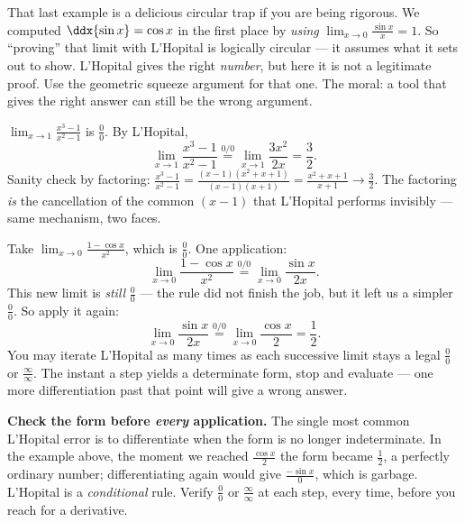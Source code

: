 \begin{trapbox}
That last example is a delicious circular trap if you are being rigorous. We computed
$\ddx{\sin x}=\cos x$ in the first place by \emph{using}
$\lim_{x\to0}\tfrac{\sin x}{x}=1$. So ``proving'' that limit with L'Hopital is
logically circular --- it assumes what it sets out to show. L'Hopital gives the right
\emph{number}, but here it is not a legitimate proof. Use the geometric squeeze
argument for that one. The moral: a tool that gives the right answer can still be the
wrong argument.
\end{trapbox}

\begin{example}
$\displaystyle\lim_{x\to 1}\frac{x^3-1}{x^2-1}$ is $\tfrac{0}{0}$. By L'Hopital,
\[
\lim_{x\to 1}\frac{x^3-1}{x^2-1}\overset{0/0}{=}\lim_{x\to 1}\frac{3x^2}{2x}
=\frac{3}{2}.
\]
Sanity check by factoring: $\frac{x^3-1}{x^2-1}=\frac{(x-1)(x^2+x+1)}{(x-1)(x+1)}
=\frac{x^2+x+1}{x+1}\to\frac{3}{2}$. The factoring \emph{is} the cancellation of the
common $(x-1)$ that L'Hopital performs invisibly --- same mechanism, two faces.
\end{example}

\begin{example}\label{ch18:ex-twice}
Take $\displaystyle\lim_{x\to 0}\frac{1-\cos x}{x^2}$, which is $\tfrac{0}{0}$. One
application:
\[
\lim_{x\to 0}\frac{1-\cos x}{x^2}\overset{0/0}{=}\lim_{x\to 0}\frac{\sin x}{2x}.
\]
This new limit is \emph{still} $\tfrac{0}{0}$ --- the rule did not finish the job, but
it left us a simpler $\tfrac00$. So apply it again:
\[
\lim_{x\to 0}\frac{\sin x}{2x}\overset{0/0}{=}\lim_{x\to 0}\frac{\cos x}{2}
=\frac{1}{2}.
\]
You may iterate L'Hopital as many times as each successive limit stays a legal
$\tfrac00$ or $\tfrac{\infty}{\infty}$. The instant a step yields a determinate form,
stop and evaluate --- one more differentiation past that point will give a wrong
answer.
\end{example}

\begin{trapbox}
\textbf{Check the form before \emph{every} application.} The single most common
L'Hopital error is to differentiate when the form is no longer indeterminate. In the
example above, the moment we reached $\tfrac{\cos x}{2}$ the form became
$\tfrac{1}{2}$, a perfectly ordinary number; differentiating again would give
$\tfrac{-\sin x}{0}$, which is garbage. L'Hopital is a \emph{conditional} rule. Verify
$\tfrac00$ or $\tfrac{\infty}{\infty}$ at each step, every time, before you reach for a
derivative.
\end{trapbox}

